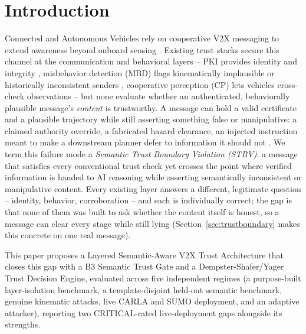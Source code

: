 \documentclass[conference]{IEEEtran}
\begin{document}
\section{Introduction}
Connected and Autonomous Vehicles rely on cooperative V2X messaging to extend awareness beyond onboard sensing \cite{b1,b2,b3}. Existing trust stacks secure this channel at the communication and behavioral layers -- PKI provides identity and integrity \cite{b4,b5,b6}, misbehavior detection (MBD) flags kinematically implausible or historically inconsistent senders \cite{b7}, cooperative perception (CP) lets vehicles cross-check observations \cite{r_cp_fabrication} -- but none evaluate whether an authenticated, behaviorally plausible message's \emph{content} is trustworthy. A message can hold a valid certificate and a plausible trajectory while still asserting something false or manipulative: a claimed authority override, a fabricated hazard clearance, an injected instruction meant to make a downstream planner defer to information it should not \cite{b10,b11}. We term this failure mode a \emph{Semantic Trust Boundary Violation (STBV)}: a message that satisfies every conventional trust check yet crosses the point where verified information is handed to AI reasoning while asserting semantically inconsistent or manipulative content. Every existing layer answers a different, legitimate question -- identity, behavior, corroboration -- and each is individually correct; the gap is that none of them was built to ask whether the content itself is honest, so a message can clear every stage while still lying (Section~\ref{sec:trustboundary} makes this concrete on one real message).

This paper proposes a Layered Semantic-Aware V2X Trust Architecture that closes this gap with a B3 Semantic Trust Gate and a Dempster-Shafer/Yager Trust Decision Engine, evaluated across five independent regimes (a purpose-built layer-isolation benchmark, a template-disjoint held-out semantic benchmark, genuine kinematic attacks, live CARLA and SUMO deployment, and an adaptive attacker), reporting two CRITICAL-rated live-deployment gaps alongside its strengths.
\end{document}
